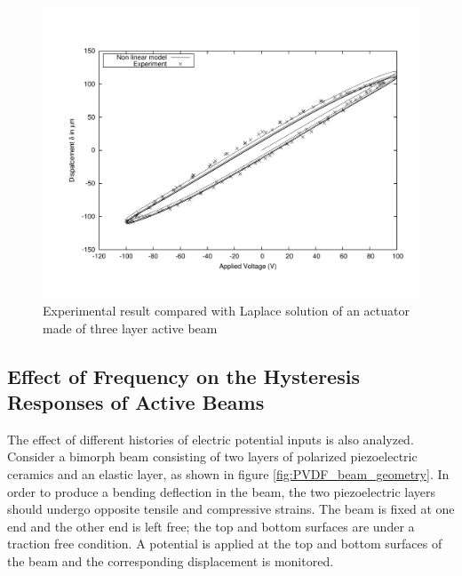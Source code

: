 \begin{figure}
\centering
\includegraphics[width=6.0in]{./chap_4_structural_analyses/pdf_beam/electric_field_vs_displacement_three_layer_beam.pdf}
\caption{Experimental result \cite{Li2004959} compared with Laplace solution of an actuator made of three layer active beam}
\label{fig:electric_volt_vs_displacement_three_layer_beam}
\end{figure}

\subsection{Effect of Frequency on the Hysteresis Responses of Active Beams}
The effect of different histories of electric potential inputs is also analyzed.
Consider a bimorph beam consisting of two layers of polarized piezoelectric ceramics and an elastic layer, as shown in figure \ref{fig:PVDF_beam_geometry}. %
In order to produce a bending deflection in the beam, the two piezoelectric layers should undergo opposite tensile and compressive strains.
The beam is fixed at one end and the other end is left free;
 the top and bottom surfaces are under a traction free condition.
 A potential is applied at the top and bottom surfaces of the beam and the corresponding displacement is monitored.

